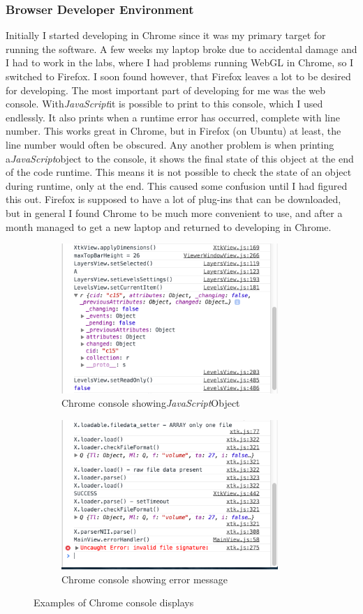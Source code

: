 \documentclass[a4paper,11pt,twoside]{article}
\begin{document}
\subsubsection{Browser Developer Environment}

Initially I started developing in Chrome since it was my primary target for running the software. A few weeks my laptop broke due to accidental damage and I had to work in the labs, where I had problems running WebGL in Chrome, so I switched to Firefox. I soon found however, that Firefox leaves a lot to be desired for developing. The most important part of developing for me was the web console. With\textit{JavaScript}it is possible to print to this console, which I used endlessly. It also prints when a runtime error has occurred, complete with line number. This works great in Chrome, but in Firefox (on Ubuntu) at least, the line number would often be obscured. Any another problem is when printing a\textit{JavaScript}object to the console, it shows the final state of this object at the end of the code runtime. This means it is not possible to check the state of an object during runtime, only at the end. This caused some confusion until I had figured this out. Firefox is supposed to have a lot of plug-ins that can be downloaded, but in general I found Chrome to be much more convenient to use, and after a month managed to get a new laptop and returned to developing in Chrome.


\begin{figure}
\centering
\begin{subfigure}{.5\textwidth}
  \centering
  \includegraphics[width=82mm]{graphics/console_01.png}
  \caption{Chrome console showing\textit{JavaScript}Object}
\end{subfigure}%
\begin{subfigure}{.5\textwidth}
  \centering
  \includegraphics[width=82mm]{graphics/console_02.png}
  \caption{Chrome console showing error message}
\end{subfigure}
\caption{Examples of Chrome console displays}

\end{figure}
\end{document}
